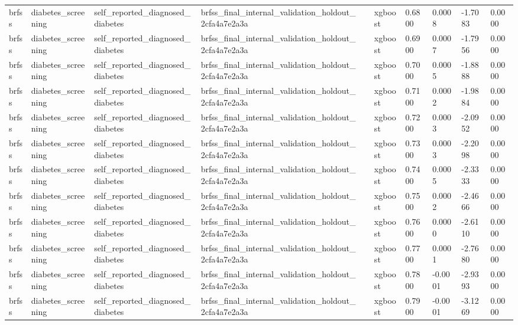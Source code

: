 \begin{tabular}{llllllllll}
brfss & diabetes\_screening & self\_reported\_diagnosed\_diabetes & brfss\_final\_internal\_validation\_holdout\_2cfa4a7e2a3a &  & xgboost & 0.6800 & 0.0008 & -1.7083 & 0.0000 \\
brfss & diabetes\_screening & self\_reported\_diagnosed\_diabetes & brfss\_final\_internal\_validation\_holdout\_2cfa4a7e2a3a &  & xgboost & 0.6900 & 0.0007 & -1.7956 & 0.0000 \\
brfss & diabetes\_screening & self\_reported\_diagnosed\_diabetes & brfss\_final\_internal\_validation\_holdout\_2cfa4a7e2a3a &  & xgboost & 0.7000 & 0.0005 & -1.8888 & 0.0000 \\
brfss & diabetes\_screening & self\_reported\_diagnosed\_diabetes & brfss\_final\_internal\_validation\_holdout\_2cfa4a7e2a3a &  & xgboost & 0.7100 & 0.0002 & -1.9884 & 0.0000 \\
brfss & diabetes\_screening & self\_reported\_diagnosed\_diabetes & brfss\_final\_internal\_validation\_holdout\_2cfa4a7e2a3a &  & xgboost & 0.7200 & 0.0003 & -2.0952 & 0.0000 \\
brfss & diabetes\_screening & self\_reported\_diagnosed\_diabetes & brfss\_final\_internal\_validation\_holdout\_2cfa4a7e2a3a &  & xgboost & 0.7300 & 0.0003 & -2.2098 & 0.0000 \\
brfss & diabetes\_screening & self\_reported\_diagnosed\_diabetes & brfss\_final\_internal\_validation\_holdout\_2cfa4a7e2a3a &  & xgboost & 0.7400 & 0.0005 & -2.3333 & 0.0000 \\
brfss & diabetes\_screening & self\_reported\_diagnosed\_diabetes & brfss\_final\_internal\_validation\_holdout\_2cfa4a7e2a3a &  & xgboost & 0.7500 & 0.0002 & -2.4666 & 0.0000 \\
brfss & diabetes\_screening & self\_reported\_diagnosed\_diabetes & brfss\_final\_internal\_validation\_holdout\_2cfa4a7e2a3a &  & xgboost & 0.7600 & 0.0000 & -2.6110 & 0.0000 \\
brfss & diabetes\_screening & self\_reported\_diagnosed\_diabetes & brfss\_final\_internal\_validation\_holdout\_2cfa4a7e2a3a &  & xgboost & 0.7700 & 0.0001 & -2.7680 & 0.0000 \\
brfss & diabetes\_screening & self\_reported\_diagnosed\_diabetes & brfss\_final\_internal\_validation\_holdout\_2cfa4a7e2a3a &  & xgboost & 0.7800 & -0.0001 & -2.9393 & 0.0000 \\
brfss & diabetes\_screening & self\_reported\_diagnosed\_diabetes & brfss\_final\_internal\_validation\_holdout\_2cfa4a7e2a3a &  & xgboost & 0.7900 & -0.0001 & -3.1269 & 0.0000 \\

\end{tabular}
